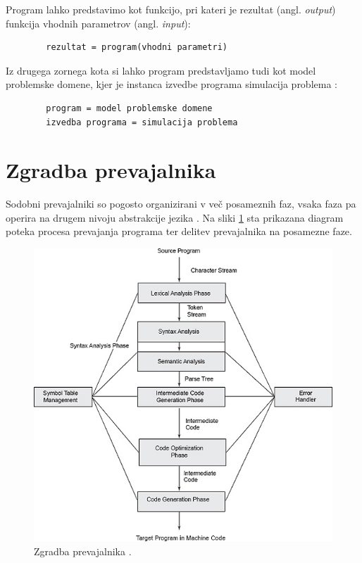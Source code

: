 \documentclass[a4paper, 12p]{book}
\begin{document}
Program lahko predstavimo kot funkcijo, pri kateri je rezultat (angl. \textit{output}) funkcija vhodnih parametrov (angl. \textit{input}):
\begin{lstlisting}
		rezultat = program(vhodni parametri)
\end{lstlisting}

Iz drugega zornega kota si lahko program predstavljamo tudi kot model problemske domene, kjer je instanca izvedbe programa simulacija problema \cite{computationalModel}:
\begin{lstlisting}
		program = model problemske domene
		izvedba programa = simulacija problema
\end{lstlisting}

\section{Zgradba prevajalnika}

Sodobni prevajalniki so pogosto organizirani v več posameznih faz, vsaka faza pa operira na drugem nivoju abstrakcije jezika \cite{modernCompiler}. Na sliki \ref{pic1} sta prikazana diagram poteka procesa prevajanja programa ter delitev prevajalnika na posamezne faze.

\begin{figure}[h]
	\begin{center}
		\includegraphics[width=1\textwidth]{resources/compilerStructure.jpg}
	\end{center}
	\caption{Zgradba prevajalnika \cite{compilerStructure}.}
	\label{pic1}
\end{figure}
\end{document}
